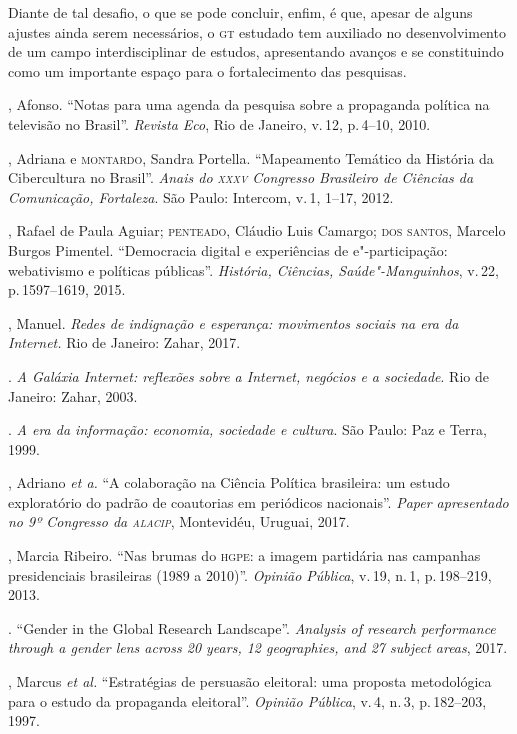 Diante de tal desafio, o que se pode concluir, enfim, é que, apesar de
alguns ajustes ainda serem necessários, o \textsc{gt} estudado tem auxiliado no
desenvolvimento de um campo interdisciplinar de estudos, apresentando
avanços e se constituindo como um importante espaço para o
fortalecimento das pesquisas.

\begin{bibliohedra}
, Afonso. ``Notas para uma agenda da pesquisa sobre a
propaganda política na televisão no Brasil''. \textit{Revista \textit{Eco}}, Rio de Janeiro, v.\,12, p.\,4--10, 2010.

, Adriana e \textsc{montardo}, Sandra Portella. ``Mapeamento
Temático da História da Cibercultura no Brasil''. \textit{Anais do \textsc{xxxv} Congresso
Brasileiro de Ciências da Comunicação, Fortaleza}. São Paulo: Intercom, v.\,1, 1--17, 2012.

, Rafael de Paula Aguiar; \textsc{penteado}, Cláudio Luis Camargo; \textsc{dos
santos}, Marcelo Burgos Pimentel. ``Democracia digital e
experiências de e"-participação: webativismo e políticas públicas''.
\textit{História, Ciências, Saúde"-Manguinhos}, v.\,22, p.\,1597--1619, 2015.

, Manuel. \textit{Redes de indignação e esperança:
movimentos sociais na era da Internet.} Rio de Janeiro: Zahar, 2017.

\titidem. \textit{A Galáxia Internet: reflexões sobre a
Internet, negócios e a sociedade}. Rio de Janeiro: Zahar, 2003.

\titidem. \textit{A era da informação: economia, sociedade
e cultura}. São Paulo: Paz e Terra, 1999.

, Adriano \textit{et a.}
``A colaboração na Ciência Política brasileira: um estudo
exploratório do padrão de coautorias em periódicos nacionais''.
\textit{Paper apresentado no 9º Congresso da \textsc{alacip}}, Montevidéu,
Uruguai, 2017.

, Marcia Ribeiro. ``Nas brumas do \textsc{hgpe}: a imagem partidária
nas campanhas presidenciais brasileiras (1989 a 2010)''. \textit{Opinião
Pública}, v.\,19, n.\,1, p.\,198--219, 2013.

. ``Gender in the Global Research Landscape''. \textit{Analysis of
research performance through a gender lens across 20 years, 12
geographies, and 27 subject areas}, 2017. 

, Marcus \textit{et al.}
``Estratégias de persuasão eleitoral: uma proposta metodológica
para o estudo da propaganda eleitoral''. \textit{Opinião Pública}, v.\,4,
n.\,3, p.\,182--203, 1997.


\end{bibliohedra}

